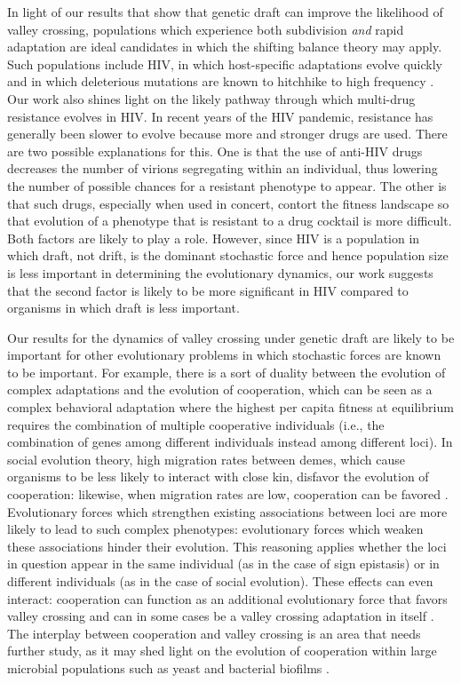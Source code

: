 \documentclass[rmp]{revtex4}
\begin{document}
\begin{spacing}{1.5}
In light of our results that show that genetic draft can improve the likelihood of valley crossing, populations which experience both subdivision \emph{and} rapid adaptation are ideal candidates in which the shifting balance theory may apply.
Such populations include HIV, in which host-specific adaptations evolve quickly \citep{zhang_1997, wain_2007, dapp_2017, theys_2018} and in which deleterious mutations are known to hitchhike to high frequency \citep{zanini_2013, zanini_2015}.
Our work also shines light on the likely pathway through which multi-drug resistance evolves in HIV.
In recent years of the HIV pandemic, resistance has generally been slower to evolve \citep{feder_2015} because more and stronger drugs are used.
There are two possible explanations for this.
One is that the use of anti-HIV drugs decreases the number of virions segregating within an individual, thus lowering the number of possible chances for a resistant phenotype to appear.
The other is that such drugs, especially when used in concert, contort the fitness landscape so that evolution of a phenotype that is resistant to a drug cocktail is more difficult.
Both factors are likely to play a role.
However, since HIV is a population in which draft, not drift, is the dominant stochastic force and hence population size is less important in determining the evolutionary dynamics, our work suggests that the second factor is likely to be more significant in HIV compared to organisms in which draft is less important.

Our results for the dynamics of valley crossing under genetic draft are likely to be important for other evolutionary problems in which stochastic forces are known to be important.
For example, there is a sort of duality between the evolution of complex adaptations and the evolution of cooperation, which can be seen as a complex behavioral adaptation where the highest per capita fitness at equilibrium requires the combination of multiple cooperative individuals (i.e., the combination of genes among different individuals instead among different loci).
In social evolution theory, high migration rates between demes, which cause organisms to be less likely to interact with close kin, disfavor the evolution of cooperation: likewise, when migration rates are low, cooperation can be favored \citep{Hamilton:1970,Rousset:2004,van_cleve_2015}.
Evolutionary forces which strengthen existing associations between loci are more likely to lead to such complex phenotypes: evolutionary forces which weaken these associations hinder their evolution.
This reasoning applies whether the loci in question appear in the same individual (as in the case of sign epistasis) or in different individuals (as in the case of social evolution).
These effects can even interact: cooperation can function as an additional evolutionary force that favors valley crossing \citep{Obolski:Lewin-Epstein:2017} and can in some cases be a valley crossing adaptation in itself \citep{van_cleve_2013}.
The interplay between cooperation and valley crossing is an area that needs further study, as it may shed light on the evolution of cooperation within large microbial populations such as yeast \citep{gore_2009, gore_2013} and bacterial biofilms \citep{rainey_2003, van_gestel_2014}.



\end{spacing}
\end{document}
